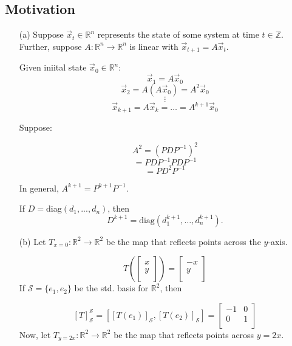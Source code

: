 \documentclass[a4paper,10pt]{article}
\begin{document}
\subsection{Motivation}
\begin{enumerate}
\item[(a)] Suppose $\vec{x}_t \in \mathbb{R}^n$ represents the state of some system at time $t \in \mathbb{Z}$. Further, suppose $A: \mathbb{R}^n \to \mathbb{R}^n$ is linear with $\vec{x}_{t+1} = A\vec{x}_t$.

Given iniital state $\vec{x}_0 \in \mathbb{R}^n$:
$$\vec{x}_1 = A \vec{x}_0$$
$$\vec{x}_2 = A(A \vec{x}_0) = A^2 \vec{x}_0$$
$$\vdots$$
$$\vec{x}_{k+1} = A\vec{x}_k = \ldots = A^{k+1}\vec{x}_0$$

Suppose:
\begin{center}
	
\end{center}

$$A^2 = (PDP^{-1})^2$$
$$=PDP^{-1} PDP^{-1}$$
$$=PD^2P^{-1}$$

In general, $A^{k+1} = P^{k+1}P^{-1}$.

If $D=$diag$(d_1,...,d_n)$, then 
$$D^{k+1} = \text{diag}(d_1^{k+1}, \ldots, d_n^{k+1}).$$

\item[(b)] Let $T_{x=0}: \mathbb{R}^2 \to \mathbb{R}^2$ be the map that reflects points across the $y$-axis.

$$T\left(
\begin{bmatrix}
	x \\
	y \\
\end{bmatrix}
\right)
=
\begin{bmatrix}
	-x \\
	y \\
\end{bmatrix}
$$
If $\mathcal{S} = 	\{ e_1, e_2 \}$ be the std. basis for $\mathbb{R}^2$, then

$$
[T]_\mathcal{S}^\mathcal{S} = [[T(e_1)]_\mathcal{S}, [T(e_2)]_\mathcal{S}]
=
\begin{bmatrix}
	-1 & 0 \\
	0 & 1 \\
\end{bmatrix}
$$
Now, let $T_{y=2x}: \mathbb{R}^2 \to \mathbb{R}^2$ be the map that reflects points across $y=2x$.


\end{enumerate}
\end{document}
